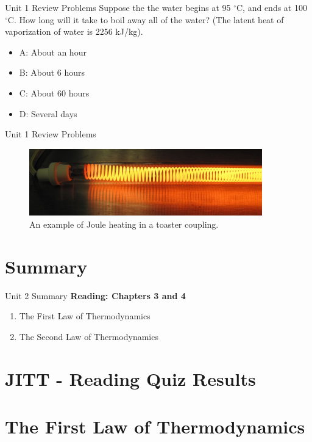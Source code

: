 \documentclass{beamer}
\begin{document}
\begin{frame}{Unit 1 Review Problems}
Suppose the the water begins at 95 $^{\circ}$C, and ends at 100 $^{\circ}$C.  How long will it take to boil away all of the water?  (The latent heat of vaporization of water is 2256 kJ/kg).
\begin{itemize}
\item A: About an hour
\item B: About 6 hours
\item C: About 60 hours
\item D: Several days
\end{itemize}
\end{frame}

\begin{frame}{Unit 1 Review Problems}
\begin{figure}
\centering
\includegraphics[width=0.9\textwidth]{figures/toaster.JPG}
\caption{\label{fig:toast} An example of Joule heating in a toaster coupling.}
\end{figure}
\end{frame}

\section{Summary}

\begin{frame}{Unit 2 Summary}
\textbf{Reading: Chapters 3 and 4}
\begin{enumerate}
\item The First Law of Thermodynamics
\item The Second Law of Thermodynamics
\end{enumerate}
\end{frame}

\section{JITT - Reading Quiz Results}

\section{The First Law of Thermodynamics}
\end{document}
